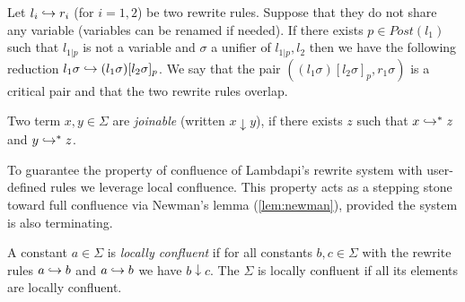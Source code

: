\begin{definition}\label{def:critical-pair}
Let $l_i \hookrightarrow r_i$ (for $i = 1, 2$) be two rewrite rules. Suppose that they do not share any variable (variables can be renamed if needed).
If there exists $p \in Post(l_1)$ such that $l_{1 | p}$ is not a variable and $\sigma$ a unifier of $l_{1 | p}, l_2$ then
we have the following reduction $l_1 \sigma \hookrightarrow (l_1\sigma)[l_2\sigma]_p$. We say that the pair $((l_1\sigma)[l_2\sigma]_p, r_1\sigma)$ is a
critical pair and that the two rewrite rules overlap.
\begin{center}
\end{center}
\end{definition}

\begin{definition}[Joinable]
Two term $x, y \in \Sigma$ are \emph{joinable} (written $x \downarrow y$), if there exists $z$ such that $x \hookrightarrow^* z$ and $y \hookrightarrow^* z$.
\end{definition}

To guarantee the property of confluence of Lambdapi's rewrite system with user-defined rules we leverage local confluence.
This property acts as a stepping stone toward full confluence via Newman's lemma (\cref{lem:newman}), provided the system is also terminating.

\begin{definition}
A constant $a \in \Sigma$ is \emph{locally confluent} if for all constants $b,c \in \Sigma$ with the rewrite rules $a \hookrightarrow b$ and $a \hookrightarrow b$
we have $b \downarrow c$. The $\Sigma$ is locally confluent if all its elements are locally confluent.
\end{definition}

